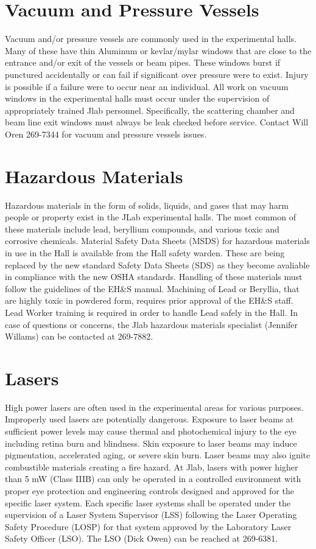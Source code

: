 \section{Vacuum and Pressure Vessels}

	Vacuum and/or pressure vessels are commonly used in the experimental halls. Many 
of these have thin Aluminum or kevlar/mylar windows that are close to the entrance 
and/or exit of the vessels or beam pipes. These windows burst if punctured accidentally 
or can fail if significant over pressure were to exist. Injury is possible if a failure 
were to occur near an individual. All work on vacuum windows in the experimental halls 
must occur under the supervision of appropriately trained Jlab personnel. Specifically, 
the scattering chamber and beam line exit windows must always be leak checked before service. 
Contact Will Oren 269-7344 for vacuum and pressure vessels issues.

\section{Hazardous Materials}

	Hazardous materials in the form of solids, liquids, and gases that may harm people 
or property exist in the JLab experimental halls. The most common of these materials include 
lead, beryllium compounds, and various toxic and corrosive chemicals. 
Material Safety Data Sheets (MSDS) for hazardous materials 
in use in the Hall is available from the Hall safety warden.  These are being replaced by the new standard
Safety Data Sheets (SDS) as they become avaliable in compliance with the new OSHA standards.    Handling of these materials 
must follow the guidelines of the EH\&S manual. Machining of Lead or Beryllia, that 
are highly toxic in powdered form, requires prior approval of the EH\&S staff. 
Lead Worker training is required in order to handle Lead safely in the Hall. 
In case of questions or concerns, the Jlab hazardous materials specialist (Jennifer Willams) can be contacted at 269-7882.

\section{Lasers}

	High power lasers are often used in the experimental areas for various purposes. Improperly 
used lasers are potentially dangerous. Exposure to laser beams at sufficient power levels 
may cause thermal and photochemical injury to the eye including retina burn and blindness. 
Skin exposure to laser beams may induce pigmentation, accelerated aging, or severe skin burn. 
Laser beams may also ignite combustible materials creating a fire hazard. At Jlab, lasers with power 
higher than 5 mW (Class IIIB) can only be operated in a controlled environment with proper eye protection 
and engineering controls designed and approved for the specific laser system. Each specific laser systems 
shall be operated under the supervision of a Laser System Supervisor (LSS) following the Laser 
Operating Safety Procedure (LOSP) for that system approved by the Laboratory Laser Safety Officer (LSO). 
The LSO (Dick Owen) can be reached at 269-6381.

